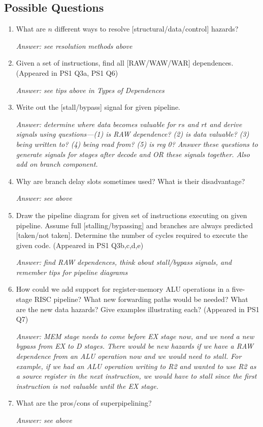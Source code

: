 \documentclass{article}
\begin{document}
\subsection{Possible Questions}

\begin{enumerate}
\item What are $n$ different ways to resolve [structural/data/control] hazards?

\textit{Answer: see resolution methods above}

\item Given a set of instructions, find all [RAW/WAW/WAR] dependences. (Appeared in PS1 Q3a, PS1 Q6)

\textit{Answer: see tips above in Types of Dependences}

\item Write out the [stall/bypass] signal for given pipeline.

\textit{Answer: determine where data becomes valuable for $rs$ and $rt$ and derive signals using questions---(1) is RAW dependence? (2) is data valuable? (3) being written to? (4) being read from? (5) is reg 0? Answer these questions to generate signals for stages after decode and OR these signals together. Also add on branch component.}

\item Why are branch delay slots sometimes used? What is their disadvantage?

\textit{Answer: see above}

\item Draw the pipeline diagram for given set of instructions executing on given pipeline. Assume full [stalling/bypassing] and branches are always predicted [taken/not taken]. Determine the number of cycles required to execute the given code. (Appeared in PS1 Q3b,c,d,e)

\textit{Answer: find RAW dependences, think about stall/bypass signals, and remember tips for pipeline diagrams}

\item How could we add support for register-memory ALU operations in a five-stage RISC pipeline? What new forwarding paths would be needed? What are the new data hazards? Give examples illustrating each? (Appeared in PS1 Q7)

\textit{Answer: MEM stage needs to come before EX stage now, and we need a new bypass from EX to D stages. There would be new hazards if we have a RAW dependence from an ALU operation now and we would need to stall. For example, if we had an ALU operation writing to R2 and wanted to use R2 as a source register in the next instruction, we would have to stall since the first instruction is not valuable until the EX stage.}

\item What are the pros/cons of superpipelining?

\textit{Answer: see above}
\end{enumerate}
\end{document}
